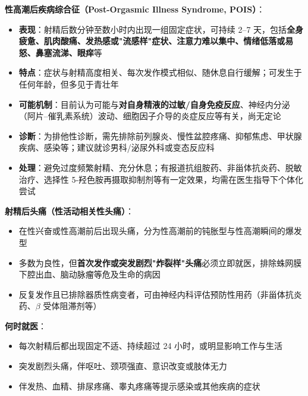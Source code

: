 \documentclass[12pt,a4paper,twoside]{ctexbook}
\begin{document}
\vspace{0.5em}
\noindent\textbf{性高潮后疾病综合征（Post-Orgasmic Illness Syndrome, POIS）}：

\begin{itemize}[leftmargin=2cm]
	\item \textbf{表现}：射精后数分钟至数小时内出现一组固定症状，可持续 2--7 天，包括\textbf{全身疲惫、肌肉酸痛、发热感或"流感样"症状、注意力难以集中、情绪低落或易怒、鼻塞流涕、眼痒}等
	\item \textbf{特点}：症状与射精高度相关、每次发作模式相似、随休息自行缓解；可发生于任何年龄，但多见于青壮年
	\item \textbf{可能机制}：目前认为可能与\textbf{对自身精液的过敏/自身免疫反应}、神经内分泌（阿片--催乳素系统）波动、细胞因子介导的炎症反应等有关，尚无定论
	\item \textbf{诊断}：为排他性诊断，需先排除前列腺炎、慢性盆腔疼痛、抑郁焦虑、甲状腺疾病、感染等；建议就诊男科/泌尿外科或变态反应科
	\item \textbf{处理}：避免过度频繁射精、充分休息；有报道抗组胺药、非甾体抗炎药、脱敏治疗、选择性 5-羟色胺再摄取抑制剂等有一定效果，均需在医生指导下个体化尝试
\end{itemize}

\vspace{0.5em}
\noindent\textbf{射精后头痛（性活动相关性头痛）}：

\begin{itemize}[leftmargin=2cm]
	\item 在性兴奋或性高潮前后出现头痛，分为性高潮前的钝胀型与性高潮瞬间的爆发型
	\item 多数为良性，但\textbf{首次发作或突发剧烈"炸裂样"头痛}必须立即就医，排除蛛网膜下腔出血、脑动脉瘤等危及生命的病因
	\item 反复发作且已排除器质性病变者，可由神经内科评估预防性用药（非甾体抗炎药、$\beta$ 受体阻滞剂等）
\end{itemize}

\vspace{0.5em}
\noindent\textbf{何时就医}：

\begin{itemize}[leftmargin=2cm]
	\item 每次射精后都出现固定不适、持续超过 24 小时，或明显影响工作与生活
	\item 突发剧烈头痛，伴呕吐、颈项强直、意识改变或肢体无力
	\item 伴发热、血精、排尿疼痛、睾丸疼痛等提示感染或其他疾病的症状
\end{itemize}
\end{document}
